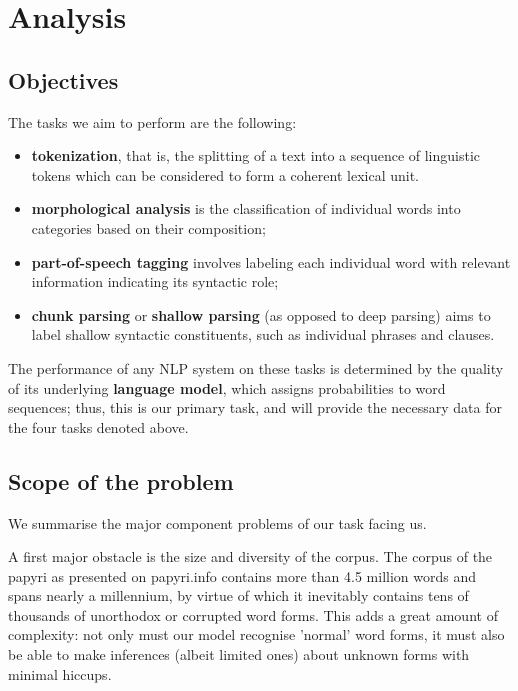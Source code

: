 
\chapter{Analysis}
\label{chp:analysis}

\section{Objectives}
The tasks we aim to perform are the following: 

\begin{itemize}
\item \textbf{tokenization}, that is, the splitting of a text into a
sequence of linguistic tokens which can be considered to form a
coherent lexical unit.
\item \textbf{morphological analysis} is the classification of
individual words into categories based on their composition;
\item \textbf{part-of-speech tagging} involves labeling each
  individual word with relevant information indicating its syntactic
  role;
\item \textbf{chunk parsing} or \textbf{shallow parsing} (as opposed to deep parsing)
  aims to label shallow syntactic constituents, such as individual
  phrases and clauses.
\end{itemize}

The performance of any NLP system on these tasks is determined by the
quality of its underlying \textbf{language model}, which assigns
probabilities to word sequences; thus, this is our primary task, and
will provide the necessary data for the four tasks denoted above.

\section{Scope of the problem}
We summarise the major component problems of our task facing us.

A first major obstacle is the size and diversity of the corpus. The
corpus of the papyri as presented on papyri.info contains more than
4.5 million words and spans nearly a millennium, by virtue of which it
inevitably contains tens of thousands of unorthodox or corrupted word
forms.  This adds a great amount of complexity: not only must our
model recognise 'normal' word forms, it must also be able to make
inferences (albeit limited ones) about unknown forms with minimal hiccups.

